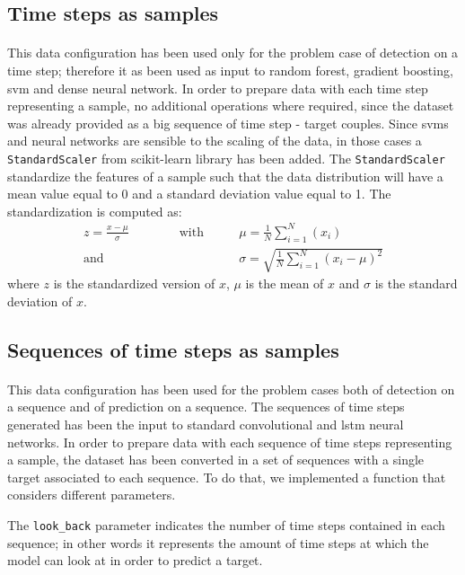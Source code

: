 \subsection{Time steps as samples}
\paragraph{} This data configuration has been used only for the problem case of detection on a time step; therefore it as been used as input to random forest, gradient boosting, \acs{svm} and dense neural network. In order to prepare data with each time step representing a sample, no additional operations where required, since the dataset was already provided as a big sequence of time step - target couples. Since \acsp{svm} and neural networks are sensible to the scaling of the data, in those cases a \texttt{StandardScaler} from scikit-learn library has been added. The \texttt{StandardScaler} standardize the features of a sample such that the data distribution will have a mean value equal to 0 and a standard deviation value equal to 1. The standardization is computed as:
\begin{align}
    z=\frac{x-\mu}{\sigma} \qquad\qquad \text{with}\qquad &\mu=\frac{1}{N} \sum_{i=1}^{N}\left(x_{i}\right)\\
                                        \text{and}\qquad &\sigma=\sqrt{\frac{1}{N} \sum_{i=1}^{N}\left(x_{i}-\mu\right)^{2}}
\end{align}
where $z$ is the standardized version of $x$, $\mu$ is the mean of $x$ and $\sigma$ is the standard deviation of $x$.

\subsection{Sequences of time steps as samples}
\paragraph{} This data configuration has been used for the problem cases both of detection on a sequence and of prediction on a sequence. The sequences of time steps generated has been the input to standard convolutional and 
\acs{lstm} neural networks. In order to prepare data with each sequence of time steps representing a sample, the dataset has been converted in a set of sequences with a single target associated to each sequence. To do that, we implemented a function that considers different parameters.

The \texttt{look\_back} parameter indicates the number of time steps contained in each sequence; in other words it represents the amount of time steps at which the model can look at in order to predict a target.

